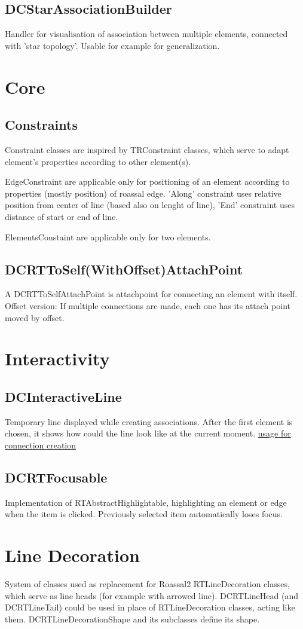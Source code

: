 \documentclass[a4paper,10pt,twoside]{book}
\begin{document}
\subsection{ DCStarAssociationBuilder}
Handler for visualisation of association between multiple elements, connected with 'star topology'. Usable for example for generalization.
\section{ Core}\subsection{ Constraints}
Constraint classes are inspired by TRConstraint classes, which serve to adapt element's properties according to other element(s).

EdgeConstraint are applicable only for positioning of an element according to properties (mostly position) of roassal edge.
'Along' constraint uses relative position from center of line (based also on lenght of line), 'End' constraint uses distance of start or end of line.

ElementsConstaint are applicable only for two elements.
\subsection{ DCRTToSelf(WithOffset)AttachPoint}
A DCRTToSelfAttachPoint is attachpoint for connecting an element with itself.
Offset version: If multiple connections are made, each one has its attach point moved by offset.
\section{ Interactivity}\subsection{ DCInteractiveLine}
Temporary line displayed while creating associations. After the first element is chosen, it shows how could the line look like at the current moment.
\href{../figures/connection%20creation%20tool%20sequence.png}{usage for connection creation}
\subsection{ DCRTFocusable}
Implementation of RTAbstractHighlightable, highlighting an element or edge when the item is clicked. Previously selected item automatically loses focus.
\section{ Line Decoration}
System of classes used as replacement for Roassal2 RTLineDecoration classes, which serve as line heads (for example with arrowed line).
DCRTLineHead (and DCRTLineTail) could be used in place of RTLineDecoration classes, acting like them.
DCRTLineDecorationShape and its subclasses define its shape.
\end{document}
